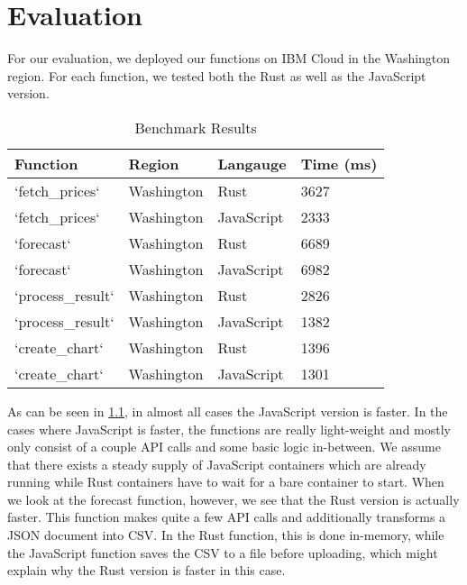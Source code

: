 \chapter{\label{chap:evaluation}Evaluation}

For our evaluation, we deployed our functions on IBM Cloud in the Washington region.
For each function, we tested both the Rust as well as the JavaScript version.

\begin{table}[h]
  \centering
  \begin{tabular}{|l|l|l|l|}
    \hline
    Function          & Region     & Langauge   & Time (ms) \\ \hline
    `fetch\_prices`   & Washington & Rust       & 3627      \\ \hline
    `fetch\_prices`   & Washington & JavaScript & 2333      \\ \hline
    `forecast`        & Washington & Rust       & 6689      \\ \hline
    `forecast`        & Washington & JavaScript & 6982      \\ \hline
    `process\_result` & Washington & Rust       & 2826      \\ \hline
    `process\_result` & Washington & JavaScript & 1382      \\ \hline
    `create\_chart`   & Washington & Rust       & 1396      \\ \hline
    `create\_chart`   & Washington & JavaScript & 1301      \\ \hline
  \end{tabular}
  \caption{Benchmark Results}
  \label{tab:benchmark}
\end{table}

As can be seen in \cref{tab:benchmark}, in almost all cases the JavaScript version is faster.
In the cases where JavaScript is faster, the functions are really light-weight and
mostly only consist of a couple API calls and some basic logic in-between. We assume
that there exists a steady supply of JavaScript containers which are already
running while Rust containers have to wait for a bare container to start.
When we look at the forecast function, however, we see that the Rust version is actually faster.
This function makes quite a few API calls and additionally transforms a JSON document
into CSV. In the Rust function, this is done in-memory, while the JavaScript function
saves the CSV to a file before uploading, which might explain why the Rust version
is faster in this case.

